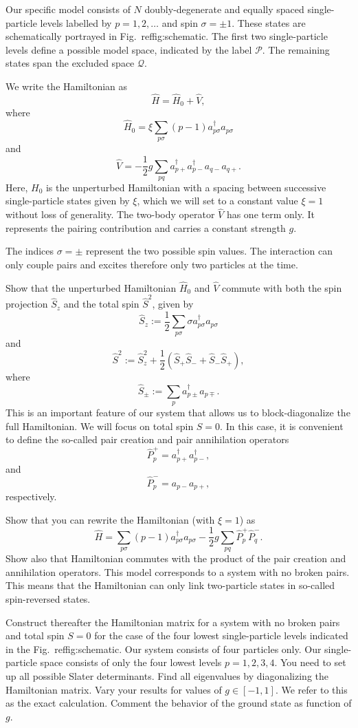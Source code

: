 \begin{prob}
Our specific model consists of $N$ doubly-degenerate and equally
spaced single-particle levels labelled by $p=1,2,\dots$ and spin
$\sigma=\pm 1$.  These states are schematically portrayed in
Fig.~ref{fig:schematic}.  The first two single-particle levels define
a possible model space, indicated by the label $\mathcal{P}$.  The
remaining states span the excluded space $\mathcal{Q}$.

We write the Hamiltonian as
\[ \hat{H} = \hat{H}_0 + \hat{V} , \]
where
\[
\hat{H}_0=\xi\sum_{p\sigma}(p-1)a_{p\sigma}^{\dagger}a_{p\sigma}
\]
and
\[
\hat{V}=-\frac{1}{2}g\sum_{pq}a^{\dagger}_{p+}
a^{\dagger}_{p-}a_{q-}a_{q+}.
\]
Here, $H_0$ is the unperturbed Hamiltonian with a spacing between
successive single-particle states given by $\xi$, which we will set to
a constant value $\xi=1$ without loss of generality. The two-body
operator $\hat{V}$ has one term only. It represents the pairing
contribution and carries a constant strength $g$.

The indices
$\sigma=\pm$ represent the two possible spin values. The interaction
can only couple pairs and excites therefore only two particles at the
time.

Show that the unperturbed Hamiltonian $\hat{H}_0$ and $\hat{V}$
  commute with both the spin projection $\hat{S}_z$ and the total spin
  $\hat{S}^2$, given by
\[
  \hat{S}_z := \frac{1}{2}\sum_{p\sigma} \sigma
  a^{\dagger}_{p\sigma}a_{p\sigma}
\]
and
\[
  \hat{S}^2 := \hat{S}_z^2 + \frac{1}{2}(\hat{S}_+\hat{S}_- +
  \hat{S}_-\hat{S}_+),
\]
where
\[
  \hat{S}_\pm := \sum_{p} a^{\dagger}_{p\pm} a_{p\mp}.
\]
This is an important feature of our system that allows us to
block-diagonalize the full Hamiltonian. We will focus on total spin
$S=0$.  In this case, it is convenient to define the so-called pair
creation and pair annihilation operators
\[
\hat{P}^{+}_p = a^{\dagger}_{p+}a^{\dagger}_{p-},
\]
and
\[
\hat{P}^{-}_p = a_{p-}a_{p+},
\]
respectively.

Show that you can rewrite the Hamiltonian (with $\xi=1$) as
\[
\hat{H}=\sum_{p\sigma}(p-1)a_{p\sigma}^{\dagger}a_{p\sigma}
-\frac{1}{2}g\sum_{pq}\hat{P}^{+}_p\hat{P}^{-}_q.
\]
Show also that Hamiltonian commutes with the product of the pair
creation and annihilation operators.  This model corresponds to a
system with no broken pairs. This means that the Hamiltonian can only
link two-particle states in so-called spin-reversed states.

Construct thereafter the Hamiltonian matrix for a system with no
  broken pairs and total spin $S=0$ for the case of the four lowest
  single-particle levels indicated in the
  Fig.~ref{fig:schematic}. Our system consists of four particles
  only.  Our single-particle space consists of only the four lowest
  levels $p=1,2,3,4$.  You need to set up all possible Slater
  determinants.  Find all eigenvalues by diagonalizing the Hamiltonian
  matrix.  Vary your results for values of $g\in [-1,1]$.  We refer to
  this as the exact calculation. Comment the behavior of the ground
  state as function of $g$.




\end{prob}
